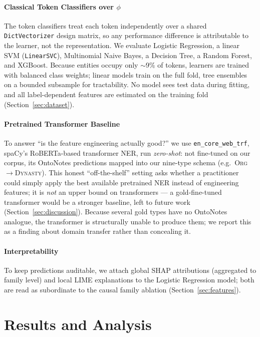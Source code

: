 \documentclass[conference]{IEEEtran}
\begin{document}
\paragraph{Classical Token Classifiers over $\phi$}

The token classifiers treat each token independently over a shared \texttt{DictVectorizer} design matrix, so any performance difference is attributable to the learner, not the representation. We evaluate Logistic Regression, a linear SVM (\texttt{LinearSVC}), Multinomial Naive Bayes, a Decision Tree, a Random Forest, and XGBoost. Because entities occupy only $\sim$9\% of tokens, learners are trained with balanced class weights; linear models train on the full fold, tree ensembles on a bounded subsample for tractability. No model sees test data during fitting, and all label-dependent features are estimated on the training fold (Section~\ref{sec:dataset}).

\paragraph{Pretrained Transformer Baseline}

To answer ``is the feature engineering actually good?'' we use \texttt{en\_core\_web\_trf}, spaCy's RoBERTa-based transformer NER, run \emph{zero-shot}: not fine-tuned on our corpus, its OntoNotes predictions mapped into our nine-type schema (e.g.\ \textsc{Org}$\rightarrow$\textsc{Dynasty}). This honest ``off-the-shelf'' setting asks whether a practitioner could simply apply the best available pretrained NER instead of engineering features; it is \emph{not} an upper bound on transformers --- a gold-fine-tuned transformer would be a stronger baseline, left to future work (Section~\ref{sec:discussion}). Because several gold types have no OntoNotes analogue, the transformer is structurally unable to produce them; we report this as a finding about domain transfer rather than concealing it.

\paragraph{Interpretability}

To keep predictions auditable, we attach global SHAP attributions (aggregated to family level) and local LIME explanations to the Logistic Regression model; both are read as subordinate to the causal family ablation (Section~\ref{sec:features}).

\section{Results and Analysis}
\label{sec:results}
\end{document}
